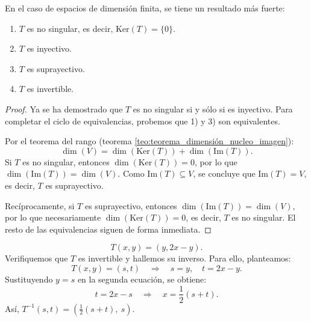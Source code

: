 En el caso de espacios de dimensión finita, se tiene un resultado más fuerte:

\begin{enumerate}
  \item \(T\) es no singular, es decir, \(\text{Ker}(T) = \{0\}\).
  \item \(T\) es inyectivo.
  \item \(T\) es suprayectivo.
  \item \(T\) es invertible.
\end{enumerate}

\begin{proof}
Ya se ha demostrado que \(T\) es no singular si y sólo si es inyectivo. Para completar el ciclo de equivalencias, probemos que 1) y 3) son equivalentes.

Por el teorema del rango (teorema \ref{teo:teorema_dimensión_nucleo_imagen}):
\[
  \dim(V) = \dim(\text{Ker}(T)) + \dim(\text{Im}(T)).
\]
Si \(T\) es no singular, entonces \(\dim(\text{Ker}(T)) = 0\), por lo que \(\dim(\text{Im}(T)) = \dim(V)\). Como \(\text{Im}(T) \subseteq V\), se concluye que \(\text{Im}(T) = V\), es decir, \(T\) es suprayectivo.

Recíprocamente, si \(T\) es suprayectivo, entonces \(\dim(\text{Im}(T)) = \dim(V)\), por lo que necesariamente \(\dim(\text{Ker}(T)) = 0\), es decir, \(T\) es no singular. El resto de las equivalencias siguen de forma inmediata.
\end{proof}

\[
  T(x, y) = (y, 2x - y).
\]
Verifiquemos que \(T\) es invertible y hallemos su inverso. Para ello, planteamos:
\[
  T(x, y) = (s, t) \quad \Rightarrow \quad s = y,\quad t = 2x - y.
\]
Sustituyendo \(y = s\) en la segunda ecuación, se obtiene:
\[
  t = 2x - s \quad \Rightarrow \quad x = \frac{1}{2}(s + t).
\]
Así, \(T^{-1}(s, t) = \left(\frac{1}{2}(s + t),~s\right)\).